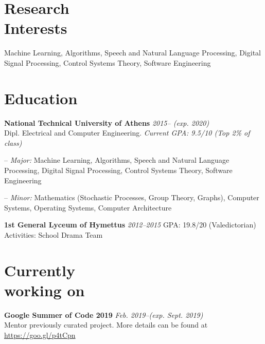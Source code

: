 \documentclass[margin]{res}
\newcommand{\field}[2]{\noindent \textbf{#1} \hfill #2 \\}
\begin{document}
\begin{resume}



\section{Research \\ Interests} Machine Learning, Algorithms, Speech and Natural Language Processing, Digital Signal Processing, Control Systems Theory, Software Engineering

\section{Education}
\textbf{National Technical University of Athens} \hfill \emph{2015-- (exp. 2020)} \\
Dipl. Electrical and Computer Engineering.  \hfill \emph{Current GPA: 9.5/10 (Top 2\% of class)} \\ 
\begin{compactitem}
\item[--] \emph{Major:} Machine Learning, Algorithms, Speech and Natural Language Processing, Digital Signal Processing, Control Systems Theory, Software Engineering \\
\item[--] \emph{Minor:} Mathematics (Stochastic Processes, Group Theory, Graphs), Computer Systems, Operating Systems, Computer Architecture 
\end{compactitem}


\textbf{1st General Lyceum of Hymettus} \hfill \emph{2012--2015} 
GPA: 19.8/20 (Valedictorian)\\
Activities: School Drama Team

\section{Currently \\ working on}
\field{Google Summer of Code 2019} {\emph{Feb. 2019--(exp. Sept. 2019)}}
Mentor previously curated project. More details can be found at \url{https://goo.gl/p4tCpn}


\end{resume}
\end{document}

